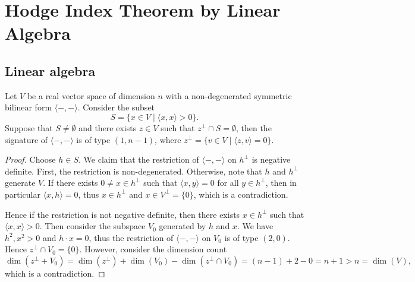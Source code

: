 \section{Hodge Index Theorem by Linear Algebra}

\subsection{Linear algebra}

    \begin{proposition}\label{prop:of_type_1_n-1_if_x2_positive_has_two_components}
        Let \(V\) be a real vector space of dimension \(n\) with a non-degenerated symmetric bilinear form \(\langle-,-\rangle\).
        Consider the subset
        \[ S = \{x \in V \mid \langle x, x \rangle > 0\}. \]
        Suppose that \(S\neq \emptyset\) and there exists \(z \in V\) such that \(z^\perp \cap S = \emptyset\), then the signature of \(\langle-,-\rangle\) is of type \((1, n-1)\), where \(z^\perp = \{v \in V \mid \langle z, v \rangle = 0\}\).
    \end{proposition}
    \begin{proof}
        Choose \(h \in S\).
        We claim that the restriction of \(\langle-,-\rangle\) on \(h^\perp\) is negative definite.
        First, the restriction is non-degenerated.
        Otherwise, note that \(h\) and \(h^\perp\) generate \(V\). 
        If there exists \(0 \neq x \in h^\perp\) such that \(\langle x, y \rangle = 0\) for all \(y \in h^\perp\), then in particular \(\langle x, h \rangle = 0\), 
        thus \(x \in h^\perp\) and \(x \in V^\perp = \{0\}\), which is a contradiction.
        
        Hence if the restriction is not negative definite, then there exists \(x \in h^\perp\) such that \(\langle x, x \rangle > 0\).
        Then consider the subspace \(V_0\) generated by \(h\) and \(x\).
        We have \(h^2,x^2 > 0\) and \(h \cdot x = 0\), thus the restriction of \(\langle-,-\rangle\) on \(V_0\) is of type \((2, 0)\).
        Hence \(z^\perp \cap V_0 = \{0\}\).
        However, consider the dimension count
        \[ \dim(z^\perp + V_0) = \dim(z^\perp) + \dim(V_0) - \dim(z^\perp \cap V_0) = (n-1) + 2 - 0 = n + 1 > n = \dim(V), \]
        which is a contradiction.
    \end{proof}

